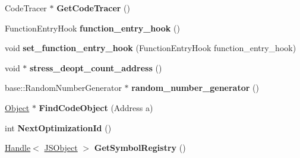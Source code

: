 \begin{DoxyCompactItemize}
\item 
\hypertarget{classv8_1_1internal_1_1_isolate_aae011e04ca5a2797e5ba70b298999c6c}{}Code\+Tracer $\ast$ {\bfseries Get\+Code\+Tracer} ()\label{classv8_1_1internal_1_1_isolate_aae011e04ca5a2797e5ba70b298999c6c}

\item 
\hypertarget{classv8_1_1internal_1_1_isolate_a4cb4122dc3aa3e140831332461ebcfa2}{}Function\+Entry\+Hook {\bfseries function\+\_\+entry\+\_\+hook} ()\label{classv8_1_1internal_1_1_isolate_a4cb4122dc3aa3e140831332461ebcfa2}

\item 
\hypertarget{classv8_1_1internal_1_1_isolate_acb73f9809c18826744761f5331dbcfd2}{}void {\bfseries set\+\_\+function\+\_\+entry\+\_\+hook} (Function\+Entry\+Hook function\+\_\+entry\+\_\+hook)\label{classv8_1_1internal_1_1_isolate_acb73f9809c18826744761f5331dbcfd2}

\item 
\hypertarget{classv8_1_1internal_1_1_isolate_a589c3f6e58352ba9ec247b59eafd27a8}{}void $\ast$ {\bfseries stress\+\_\+deopt\+\_\+count\+\_\+address} ()\label{classv8_1_1internal_1_1_isolate_a589c3f6e58352ba9ec247b59eafd27a8}

\item 
\hypertarget{classv8_1_1internal_1_1_isolate_aafb30a5fed0f8d9433be11ca8faefc8d}{}base\+::\+Random\+Number\+Generator $\ast$ {\bfseries random\+\_\+number\+\_\+generator} ()\label{classv8_1_1internal_1_1_isolate_aafb30a5fed0f8d9433be11ca8faefc8d}

\item 
\hypertarget{classv8_1_1internal_1_1_isolate_a4057faf8ad16397b1260633a12408660}{}\hyperlink{classv8_1_1internal_1_1_object}{Object} $\ast$ {\bfseries Find\+Code\+Object} (Address a)\label{classv8_1_1internal_1_1_isolate_a4057faf8ad16397b1260633a12408660}

\item 
\hypertarget{classv8_1_1internal_1_1_isolate_ae52f2af4504de1a6db0e798f2887ca2f}{}int {\bfseries Next\+Optimization\+Id} ()\label{classv8_1_1internal_1_1_isolate_ae52f2af4504de1a6db0e798f2887ca2f}

\item 
\hypertarget{classv8_1_1internal_1_1_isolate_ab8fb160ae28ebe2e3f9472139c2f4b12}{}\hyperlink{classv8_1_1internal_1_1_handle}{Handle}$<$ \hyperlink{classv8_1_1internal_1_1_j_s_object}{J\+S\+Object} $>$ {\bfseries Get\+Symbol\+Registry} ()\label{classv8_1_1internal_1_1_isolate_ab8fb160ae28ebe2e3f9472139c2f4b12}


\end{DoxyCompactItemize}
